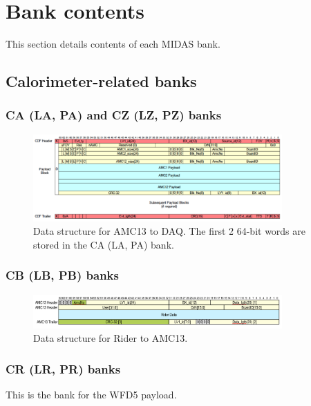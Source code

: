 \section{Bank contents}

This section details contents of each MIDAS bank. 

\subsection{Calorimeter-related banks}

\subsubsection*{CA (LA, PA) and CZ (LZ, PZ) banks}

\begin{figure}[htbp]
\centering
\includegraphics[width=0.85\textwidth]{pics/AMC13ToDAQ.pdf} 
\caption{Data structure for AMC13 to DAQ. The first 2 64-bit words are stored in the CA (LA, PA) bank.}\label{fig:AMC13ToDAQ}
\end{figure}

\subsubsection*{CB (LB, PB) banks}

\begin{figure}[htbp]
\centering
\includegraphics[width=0.85\textwidth]{pics/RiderToAMC13.pdf} 
\caption{Data structure for Rider to AMC13.}\label{fig:RiderToAMC13}
\end{figure}

\subsubsection*{CR (LR, PR) banks}

This is the bank for the WFD5 payload.

